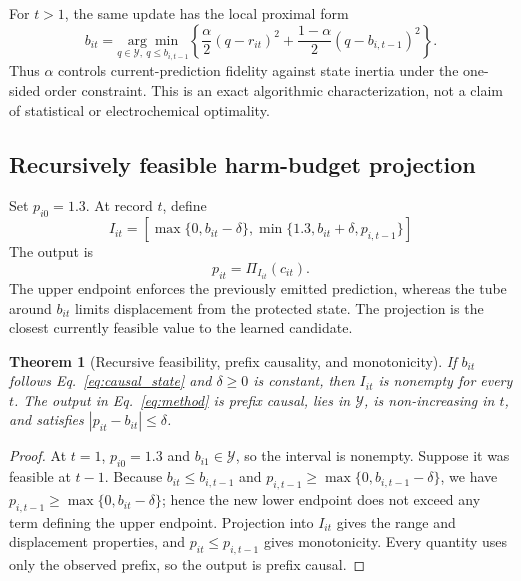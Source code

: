 \documentclass[11pt]{article}
\newtheorem{theorem}{Theorem}
\begin{document}
For $t>1$, the same update has the local proximal form
\begin{equation}
  b_{it}=\underset{q\in\mathcal Y,\ q\leq b_{i,t-1}}{\arg\min}
  \left\{
  \frac{\alpha}{2}(q-r_{it})^2+
  \frac{1-\alpha}{2}(q-b_{i,t-1})^2
  \right\}.
  \label{eq:protected_proximal}
\end{equation}
Thus $\alpha$ controls current-prediction fidelity against state inertia under the one-sided order constraint. This is an exact algorithmic characterization, not a claim of statistical or electrochemical optimality.

\subsection{Recursively feasible harm-budget projection}

Set $p_{i0}=1.3$. At record $t$, define
\begin{equation}
  I_{it}=\left[
  \max\{0,b_{it}-\delta\},
  \min\{1.3,b_{it}+\delta,p_{i,t-1}\}
  \right]
  \label{eq:feasible_interval}
\end{equation}
The output is
\begin{equation}
  p_{it}=\Pi_{I_{it}}(c_{it}).
  \label{eq:method}
\end{equation}
The upper endpoint enforces the previously emitted prediction, whereas the tube around $b_{it}$ limits displacement from the protected state. The projection is the closest currently feasible value to the learned candidate.

\begin{theorem}[Recursive feasibility, prefix causality, and monotonicity]
\label{thm:pchp}
If $b_{it}$ follows Eq.~\eqref{eq:causal_state} and $\delta\geq0$ is constant, then $I_{it}$ is nonempty for every $t$. The output in Eq.~\eqref{eq:method} is prefix causal, lies in $\mathcal Y$, is non-increasing in $t$, and satisfies $|p_{it}-b_{it}|\leq\delta$.
\end{theorem}
\begin{proof}
At $t=1$, $p_{i0}=1.3$ and $b_{i1}\in\mathcal Y$, so the interval is nonempty. Suppose it was feasible at $t-1$. Because $b_{it}\leq b_{i,t-1}$ and $p_{i,t-1}\geq\max\{0,b_{i,t-1}-\delta\}$, we have $p_{i,t-1}\geq\max\{0,b_{it}-\delta\}$; hence the new lower endpoint does not exceed any term defining the upper endpoint. Projection into $I_{it}$ gives the range and displacement properties, and $p_{it}\leq p_{i,t-1}$ gives monotonicity. Every quantity uses only the observed prefix, so the output is prefix causal.
\end{proof}
\end{document}
